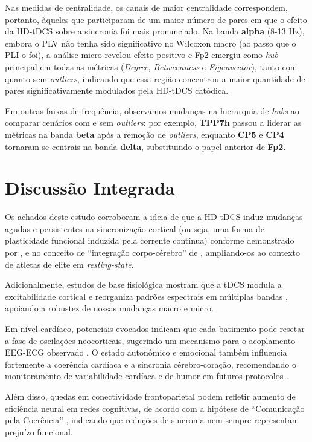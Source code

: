 Nas medidas de centralidade, os canais de maior centralidade correspondem, portanto, àqueles que participaram de um maior número de pares em que o efeito da HD-tDCS sobre a sincronia foi mais pronunciado. Na banda \textbf{alpha} (8-13 Hz), embora o PLV não tenha sido significativo no Wilcoxon macro (ao passo que o PLI o foi), a análise micro revelou efeito positivo e Fp2 emergiu como \textit{hub} principal em todas as métricas (\textit{Degree}, \textit{Betweenness} e \textit{Eigenvector}), tanto com quanto sem \textit{outliers}, indicando que essa região concentrou a maior quantidade de pares significativamente modulados pela HD-tDCS catódica.

Em outras faixas de frequência, observamos mudanças na hierarquia de \textit{hubs} ao comparar cenários com e sem \textit{outliers}: por exemplo, \textbf{TPP7h} passou a liderar as métricas na banda \textbf{beta} após a remoção de \textit{outliers}, enquanto \textbf{CP5} e \textbf{CP4} tornaram-se centrais na banda \textbf{delta}, substituindo o papel anterior de \textbf{Fp2}.

\section{Discussão Integrada}
Os achados deste estudo corroboram a ideia de que a HD-tDCS induz mudanças agudas e persistentes na sincronização cortical (ou seja, uma forma de plasticidade funcional induzida pela corrente contínua) conforme demonstrado por , e no conceito de ``integração corpo-cérebro'' de , ampliando-os ao contexto de atletas de elite em \textit{resting-state}.

Adicionalmente, estudos de base fisiológica mostram que a tDCS modula a excitabilidade cortical e reorganiza padrões espectrais em múltiplas bandas \cite{nitsche2000excitability}, apoiando a robustez de nossas mudanças macro e micro.

Em nível cardíaco, potenciais evocados indicam que cada batimento pode resetar a fase de oscilações neocorticais, sugerindo um mecanismo para o acoplamento EEG-ECG observado \cite{purpura1965intracellular}. O estado autonômico e emocional também influencia fortemente a coerência cardíaca e a sincronia cérebro-coração, recomendando o monitoramento de variabilidade cardíaca e de humor em futuros protocolos .

Além disso, quedas em conectividade frontoparietal podem refletir aumento de eficiência neural em redes cognitivas, de acordo com a hipótese de ``Comunicação pela Coerência'' , indicando que reduções de sincronia nem sempre representam prejuízo funcional.


